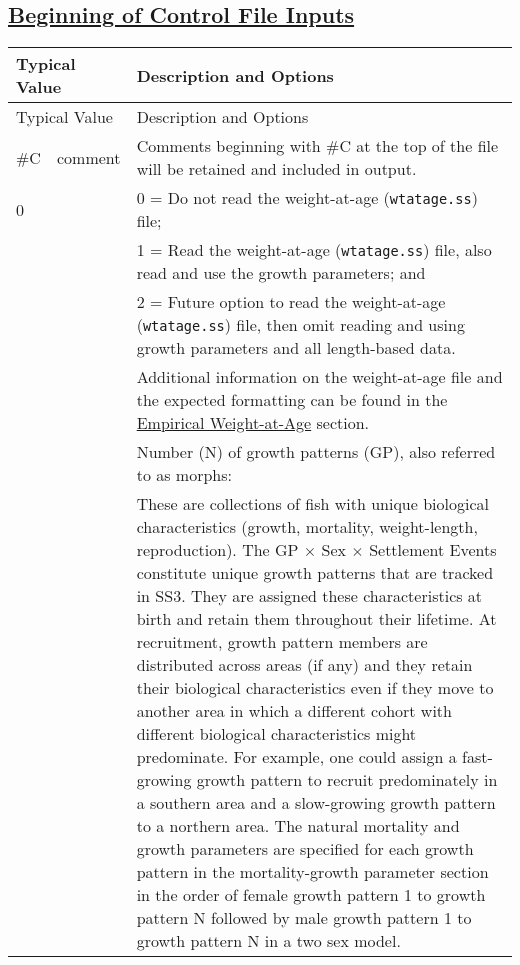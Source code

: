 \subsection[Beginning of Control File Inputs]{\protect\hyperlink{ControlInputs}{Beginning of Control File Inputs}}
\begin{center}
	\begin{longtable}{p{0.5cm} p{2cm} p{12.5cm}}
		\hline
		\multicolumn{2}{l}{Typical Value} & Description and Options \Tstrut\Bstrut\\
		\hline
		\endfirsthead

		\hline
		\multicolumn{2}{l}{Typical Value} & Description and Options \Tstrut\Bstrut\\
		\hline
		\endhead

		\hline
		\endfoot

		\endlastfoot

		\#C \Tstrut & comment & Comments beginning with \#C at the top of the file will be retained and included in output. \Bstrut\\
		\hline

		0 & & 0 = Do not read the weight-at-age (\texttt{wtatage.ss}) file; \Tstrut\\
		  & & 1 = Read the weight-at-age (\texttt{wtatage.ss}) file, also read and use the growth parameters; and \\
		  & & 2 = Future option to read the weight-at-age (\texttt{wtatage.ss}) file, then omit reading and using growth parameters and all length-based data. \\
		  & & Additional information on the weight-at-age file and the expected formatting can be found in the \hyperlink{WAA}{Empirical Weight-at-Age} section. \Bstrut\\

		\pagebreak
		1 & & Number (N) of growth patterns (GP), also referred to as morphs: \Tstrut\\
		& & These are collections of fish with unique biological characteristics (growth, mortality, weight-length, reproduction). The GP $\times$ Sex $\times$ Settlement Events constitute unique growth patterns that are tracked in SS3. They are assigned these characteristics at birth and retain them throughout their lifetime. At recruitment, growth pattern members are distributed across areas (if any) and they retain their biological characteristics even if they move to another area in which a different cohort with different biological characteristics might predominate. For example, one could assign a fast-growing growth pattern to recruit predominately in a southern area and a slow-growing growth pattern to a northern area. The natural mortality and growth parameters are specified for each growth pattern in the mortality-growth parameter section in the order of female growth pattern 1 to growth pattern N followed by male growth pattern 1 to growth pattern N in a two sex model. \Bstrut\\


\end{longtable}
\end{center}
